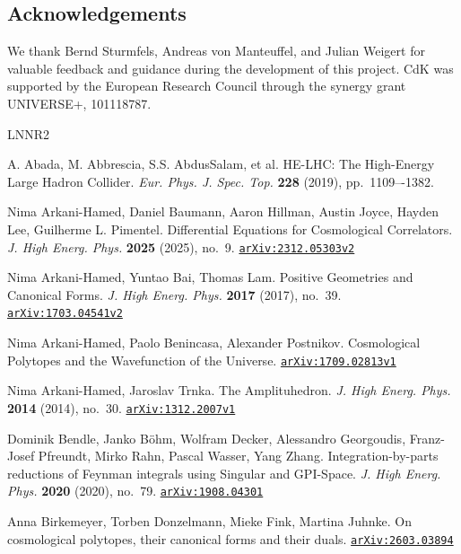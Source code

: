 \documentclass [a4paper,reqno, 11pt]{amsart}
\theoremstyle{plain}
\theoremstyle{plain}
\theoremstyle{plain}
\theoremstyle{plain}
\theoremstyle{definition}
\theoremstyle{definition}
\theoremstyle{definition}
\theoremstyle{definition}
\theoremstyle{definition}
\theoremstyle{definition}
\newcommand{\arxiv}[1]{\href{http://arxiv.org/abs/#1}{{\tt arXiv:#1}}}
\begin{document}
\subsection*{Acknowledgements}
We thank Bernd Sturmfels, Andreas von Manteuffel, and Julian Weigert  for valuable feedback and guidance during the development of this project. CdK was supported by the European Research Council through the synergy grant UNIVERSE+, 101118787. 





\begin{thebibliography}{LNNR2}


A. Abada, M. Abbrescia, S.S. AbdusSalam, et al. HE-LHC: The High-Energy Large Hadron Collider. \textit{Eur. Phys. J. Spec. Top.} \textbf{228} (2019), pp.~1109–-1382. 

Nima Arkani-Hamed, Daniel Baumann, Aaron Hillman,
Austin Joyce, Hayden Lee, Guilherme L. Pimentel. Differential Equations for Cosmological Correlators. \textit{J. High Energ. Phys.} \textbf{2025} (2025), no.~9. \arxiv{2312.05303v2}

Nima Arkani-Hamed, Yuntao Bai, Thomas Lam. Positive Geometries and Canonical Forms. \textit{J. High Energ. Phys.} \textbf{2017} (2017), no.~39. \arxiv{1703.04541v2}

Nima Arkani-Hamed, Paolo Benincasa, Alexander Postnikov. Cosmological Polytopes and the Wavefunction of the Universe. \arxiv{1709.02813v1}

Nima Arkani-Hamed, Jaroslav Trnka. The Amplituhedron. \textit{J. High Energ. Phys.} \textbf{2014} (2014), no.~30. \arxiv{1312.2007v1}


Dominik Bendle, Janko B\"ohm, Wolfram Decker, Alessandro Georgoudis, Franz-Josef Pfreundt, Mirko Rahn, Pascal Wasser, Yang Zhang. Integration-by-parts reductions of Feynman integrals using Singular and GPI-Space. \textit{J. High Energ. Phys.} \textbf{2020} (2020), no.~79. \arxiv{1908.04301}

Anna Birkemeyer, Torben Donzelmann, Mieke Fink, Martina Juhnke. On cosmological polytopes, their canonical forms and their duals. \arxiv{2603.03894}


\end{thebibliography}
\end{document}
